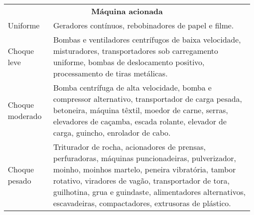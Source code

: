 \begin{table}

\begin{tabular}{ll}
\multicolumn{2}{c}{\textbf{Máquina acionada}}                                                                                                                                                                                                                                                                                                           \\
Uniforme          & Geradores contínuos,   rebobinadores de papel e filme.                                                                                                                                                                                                                                                                              \\
Choque leve       & Bombas   e ventiladores centrífugos de baixa velocidade, misturadores, transportadores   sob carregamento uniforme, bombas de deslocamento positivo, processamento de   tiras metálicas.                                                                                                                                            \\
Choque   moderado & Bomba   centrífuga de alta velocidade, bomba e compressor alternativo, transportador   de carga pesada, betoneira, máquina têxtil, moedor de carne, serras,   elevadores de caçamba, escada rolante, elevador de carga, guincho, enrolador   de cabo.                                                                               \\
Choque pesado     & Triturador de   rocha, acionadores de prensas, perfuradoras, máquinas puncionadeiras,   pulverizador, moinho, moinhos martelo, peneira vibratória, tambor rotativo,   viradores de vagão, transportador de tora, guilhotina, grua e guindaste,   alimentadores alternativos, escavadeiras, compactadores, extrusoras de   plástico.
\end{tabular}
\end{table}